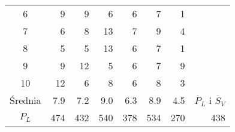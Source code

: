 \begin{table}[H]
{\begin{tabular}{|c|r|r|r|r|r|r|l}
    6     & 9                              & 9                                                    & 6                                                    & 6                                                    & 7                                                     & 1                                                     &                                       \\ \cline{1-7}
    7     & 6                              & 8                                                    & 13                                                   & 7                                                    & 9                                                     & 4                                                     &                                       \\ \cline{1-7}
    8     & 5                              & 5                                                    & 13                                                   & 6                                                    & 7                                                     & 1                                                     &                                       \\ \cline{1-7}
    9     & 9                              & 12                                                   & 5                                                    & 6                                                    & 7                                                     & 9                                                     &                                       \\ \cline{1-7}
    10    & 12                             & 6                                                    & 8                                                    & 6                                                    & 8                                                     & 3                                                     & \multicolumn{1}{r}{}                  \\ \hline
    Średnia  & 7.9                             & 7.2                                                   & 9.0                                                   & 6.3                                                   & 8.9                                                    & 4.5                                                    & \multicolumn{1}{c|}{$\overline{P}_L$ i $\overline{S}_V$} \\ \hline
    $P_L$ & 474                           & 432                                                 & 540                                                  & 378                                                 & 534                                                  & 270                                                   & \multicolumn{1}{r|}{438}             \\ \hline

\end{tabular}}
\end{table}
